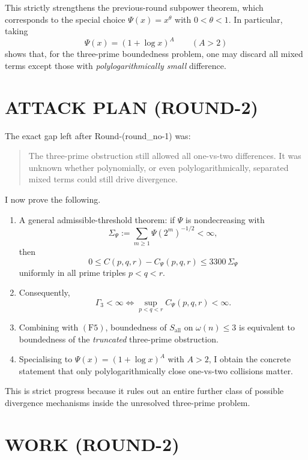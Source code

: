 This strictly strengthens the previous-round subpower theorem, which corresponds to the special choice \(\Psi(x)=x^\theta\) with \(0<\theta<1\). In particular, taking
\[
\Psi(x)=(1+\log x)^A \qquad (A>2)
\]
shows that, for the three-prime boundedness problem, one may discard all mixed terms except those with \emph{polylogarithmically small} difference.

\section{ATTACK PLAN (ROUND-2)}

The exact gap left after Round-(round\_no-1) was:

\begin{quote}
The three-prime obstruction still allowed all one-vs-two differences. It was unknown whether polynomially, or even polylogarithmically, separated mixed terms could still drive divergence.
\end{quote}

I now prove the following.

\begin{enumerate}
\item A general admissible-threshold theorem: if \(\Psi\) is nondecreasing with
\[
\Sigma_\Psi:=\sum_{m\ge 1}\Psi(2^m)^{-1/2}<\infty,
\]
then
\[
0\le C(p,q,r)-C_\Psi(p,q,r)\le 3300\,\Sigma_\Psi
\]
uniformly in all prime triples \(p<q<r\).

\item Consequently,
\[
\Gamma_3<\infty \iff \sup_{p<q<r} C_\Psi(p,q,r)<\infty.
\]

\item Combining with \((\mathrm{F5})\), boundedness of \(S_{\mathrm{all}}\) on \(\omega(n)\le 3\) is equivalent to boundedness of the \emph{truncated} three-prime obstruction.

\item Specialising to \(\Psi(x)=(1+\log x)^A\) with \(A>2\), I obtain the concrete statement that only polylogarithmically close one-vs-two collisions matter.
\end{enumerate}

This is strict progress because it rules out an entire further class of possible divergence mechanisms inside the unresolved three-prime problem.

\section{WORK (ROUND-2)}

